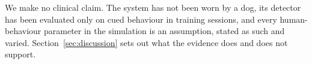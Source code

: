 We make no clinical claim. The system has not been worn by a dog, its detector has been evaluated only on cued behaviour in training sessions, and every human-behaviour parameter in the simulation is an assumption, stated as such and varied. Section~\ref{sec:discussion} sets out what the evidence does and does not support.
